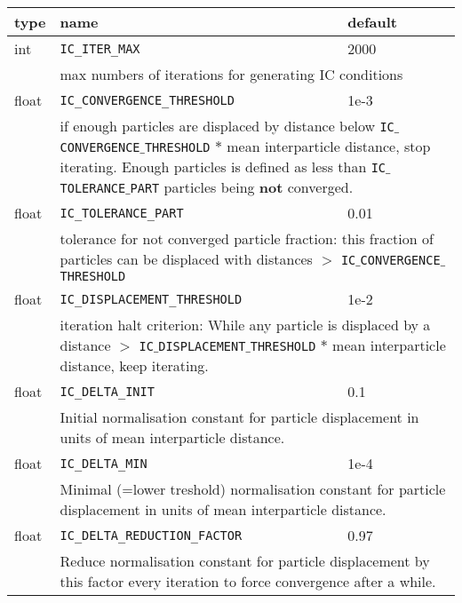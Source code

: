 \begin{tabular}{p{1.2cm} p{7cm} p{1.2cm} p{4cm}}
\hline 
\textbf{type} & \textbf{name} & \textbf{default}  &  \\ 
\hline 
int & \verb|IC_ITER_MAX| & 2000 & \\[.5em]
	& \multicolumn{3}{p{12.2cm}}{max numbers of iterations for generating IC conditions }\\
\hline 
float & \verb|IC_CONVERGENCE_THRESHOLD| & 1e-3 & \\ [.5em]
	& \multicolumn{3}{p{12.2cm}}{
		if enough particles are displaced by distance below \texttt{IC$\_$CONVERGENCE$\_$THRESHOLD} $*$ mean interparticle distance, stop iterating. 
		Enough particles is defined as less than \texttt{IC$\_$TOLERANCE$\_$PART} particles being \textbf{not} converged.
		} \\ 
\hline 
float & \verb|IC_TOLERANCE_PART| & 0.01 & \\ [.5em]
	& \multicolumn{3}{p{12.2cm}}{
		tolerance for not converged particle fraction: this fraction of particles can be displaced with distances $>$ \texttt{IC$\_$CONVERGENCE$\_$THRESHOLD} 
		}\\ 
\hline 
float & \verb|IC_DISPLACEMENT_THRESHOLD| & 1e-2 & \\ [.5em]
	& \multicolumn{3}{p{12.2cm}}{
		iteration halt criterion: While any particle is displaced by a distance $>$ \texttt{IC$\_$DISPLACEMENT$\_$THRESHOLD} $*$ mean interparticle distance, keep iterating.
		} \\ 
\hline 
float & \verb|IC_DELTA_INIT| & 0.1 & \\[.5em] 
	& \multicolumn{3}{p{12.2cm}}{
		Initial normalisation constant for particle displacement in units of mean interparticle distance.
		} \\ 
\hline 
float & \verb|IC_DELTA_MIN| & 1e-4 & \\ [.5em]
	& \multicolumn{3}{p{12.2cm}}{
		Minimal (=lower treshold) normalisation constant for particle displacement in units of mean interparticle distance.
		} \\ 
\hline 
float & \verb|IC_DELTA_REDUCTION_FACTOR| & 0.97 & \\ [.5em]
	& \multicolumn{3}{p{12.2cm}}{
		Reduce normalisation constant for particle displacement by this factor every iteration to force convergence after a while.
}
\end{tabular}
